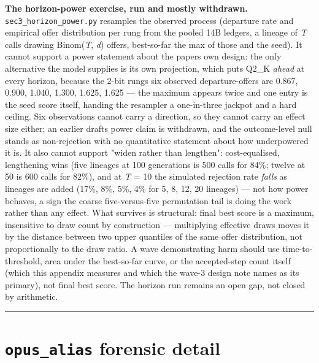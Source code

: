 \textbf{The horizon-power exercise, run and mostly withdrawn.} \texttt{sec3\_horizon\_power.py} resamples the observed process (departure rate and empirical offer distribution per rung from the pooled 14B ledgers, a lineage of \emph{T} calls drawing Binom(\emph{T}, \emph{d}) offers, best-so-far the max of those and the seed). It cannot support a power statement about the paper\textquotesingle s own design: the only alternative the model supplies is its own projection, which puts Q2\_K \emph{ahead} at every horizon, because the 2-bit rung\textquotesingle s six observed departure-offers are 0.867, 0.900, 1.040, 1.300, 1.625, 1.625 --- the maximum appears twice and one entry is the seed score itself, handing the resampler a one-in-three jackpot and a hard ceiling. Six observations cannot carry a direction, so they cannot carry an effect size either; an earlier draft\textquotesingle s power claim is withdrawn, and the outcome-level null stands as non-rejection with no quantitative statement about how underpowered it is. It also cannot support "widen rather than lengthen": cost-equalised, lengthening wins (five lineages at 100 generations is 500 calls for 84\%; twelve at 50 is 600 calls for 82\%), and at \emph{T} = 10 the simulated rejection rate \emph{falls} as lineages are added (17\%, 8\%, 5\%, 4\% for 5, 8, 12, 20 lineages) --- not how power behaves, a sign the coarse five-versus-five permutation tail is doing the work rather than any effect. What survives is structural: final best score is a maximum, insensitive to draw count by construction --- multiplying effective draws moves it by the distance between two upper quantiles of the same offer distribution, not proportionally to the draw ratio. A wave demonstrating harm should use time-to-threshold, area under the best-so-far curve, or the accepted-step count itself (which this appendix measures and which the wave-3 design note names as its primary), not final best score. The horizon run remains an open gap, not closed by arithmetic.

\begin{center}\rule{0.5\linewidth}{0.5pt}\end{center}

\hypertarget{opus_alias-forensic-detail}{%
\section{\texorpdfstring{\texttt{opus\_alias} forensic detail}{opus\_alias forensic detail}}\label{opus_alias-forensic-detail}}


